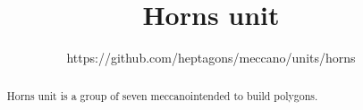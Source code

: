\documentclass[11pt]{article}
\title{\textbf{Horns unit}}
\author{https://github.com/heptagons/meccano/units/horns}
\date{}
\begin{document}
\maketitle
\begin{abstract}
Horns unit is a group of seven meccano\meccanoref intended to build polygons.
\end{abstract}

\begin{figure}[htb]
\centering
\begin{tikzpicture}

\end{tikzpicture}
\end{figure}
\end{document}
